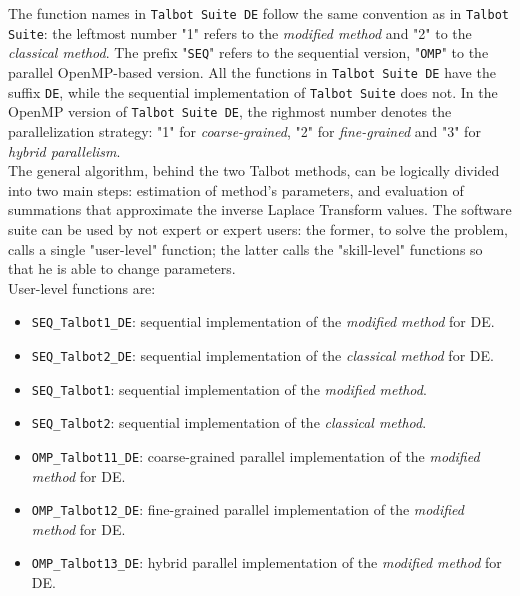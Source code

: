 \documentclass[a4paper,10pt]{report}%
\begin{document}
The function names in {\tt Talbot Suite DE} follow the same convention as in {\tt Talbot Suite}: the
leftmost number "1" refers to the {\em modified method} and "2" to the {\em classical method}.
The prefix "{\tt SEQ}" refers to the sequential version, "{\tt OMP}" to the parallel OpenMP-based version.
All the functions in {\tt Talbot Suite DE} have the suffix {\tt DE}, while the sequential implementation
of {\tt Talbot Suite} does not.
In the OpenMP version of {\tt Talbot Suite DE}, the righmost number denotes the parallelization
strategy: "1" for {\em coarse-grained}, "2" for {\em fine-grained} and "3" for {\em hybrid parallelism}.
\\[.15in]
The general algorithm, behind the two Talbot methods, can be logically divided into two main steps:
estimation of method's parameters, and evaluation of summations that approximate the inverse Laplace
Transform values.
The software suite can be used by not expert or expert users: the former, to solve the problem, calls a
single "user-level" function; the latter calls the "skill-level" functions so that he is able to change
parameters.
\\
User-level functions are:
\begin{itemize}
\item {\tt SEQ\_Talbot1\_DE}: sequential implementation of the {\em modified method} for DE.
\item {\tt SEQ\_Talbot2\_DE}: sequential implementation of the {\em classical method} for DE.
\item {\tt SEQ\_Talbot1}: sequential implementation of the {\em modified method}.
\item {\tt SEQ\_Talbot2}: sequential implementation of the {\em classical method}.
\item {\tt OMP\_Talbot11\_DE}: coarse-grained parallel implementation of the {\em modified method} for DE.
\item {\tt OMP\_Talbot12\_DE}: fine-grained parallel implementation of the {\em modified method} for DE.
\item {\tt OMP\_Talbot13\_DE}: hybrid parallel implementation of the {\em modified method} for DE.
\end{itemize}
\end{document}
